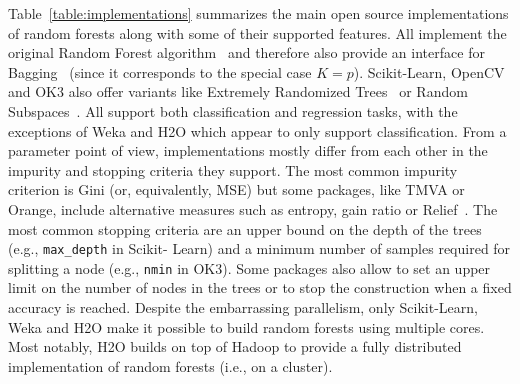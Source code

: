 Table~\ref{table:implementations} summarizes the main open source
implementations of random forests along with some of their supported features.
All implement the original Random Forest algorithm~\citep{breiman:2001} and
therefore also provide an interface for Bagging~\citep{breiman:1996b} (since it
corresponds to the special case $K=p$). Scikit-Learn, OpenCV and OK3 also offer
variants like Extremely Randomized Trees~\citep{geurts:2006} or Random
Subspaces~\citep{ho:1998}. All support both classification and regression
tasks, with the exceptions of Weka and H2O which appear to only support
classification. From a parameter point of view, implementations mostly differ
from each other in the impurity and stopping criteria they support. The most
common impurity criterion is Gini (or, equivalently, MSE) but some packages,
like TMVA or Orange, include alternative measures such as entropy, gain
ratio or Relief~\citep{kira:1992}. The most common stopping criteria are an
upper bound on the depth of the trees (e.g., \texttt{max\_depth} in Scikit-
Learn) and a minimum number of samples required for splitting a node (e.g.,
\texttt{nmin} in OK3). Some packages also allow to set an upper limit on the
number of nodes in the trees or to stop the construction when a fixed accuracy
is reached. Despite the embarrassing parallelism, only Scikit-Learn, Weka and
H2O make it possible to build random forests using multiple cores. Most
notably, H2O builds on top of Hadoop to provide a fully distributed
implementation of random forests  (i.e., on a cluster).

